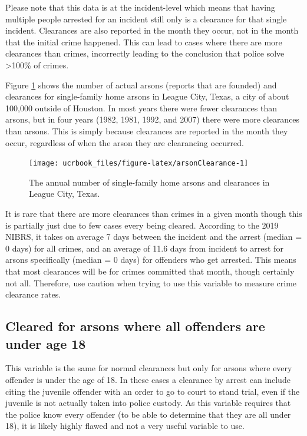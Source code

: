 \documentclass[
  12pt,
  openany]{book}
\begin{document}
Please note that this data is at the incident-level which means that having multiple people arrested for an incident still only is a clearance for that single incident. Clearances are also reported in the month they occur, not in the month that the initial crime happened. This can lead to cases where there are more clearances than crimes, incorrectly leading to the conclusion that police solve \textgreater100\% of crimes.

Figure \ref{fig:arsonClearance} shows the number of actual arsons (reports that are founded) and clearances for single-family home arsons in League City, Texas, a city of about 100,000 outside of Houston. In most years there were fewer clearances than arsons, but in four years (1982, 1981, 1992, and 2007) there were more clearances than arsons. This is simply because clearances are reported in the month they occur, regardless of when the arson they are clearancing occurred.

\begin{figure}

{\centering \texttt{[image: ucrbook\_files/figure-latex/arsonClearance-1]} 

}

\caption{The annual number of single-family home arsons and clearances in League City, Texas.}\label{fig:arsonClearance}
\end{figure}

It is rare that there are more clearances than crimes in a given month though this is partially just due to few cases every being cleared. According to the 2019 NIBRS, it takes on average 7 days between the incident and the arrest (median = 0 days) for all crimes, and an average of 11.6 days from incident to arrest for arsons specifically (median = 0 days) for offenders who get arrested. This means that most clearances will be for crimes committed that month, though certainly not all. Therefore, use caution when trying to use this variable to measure crime clearance rates.

\hypertarget{cleared-for-arsons-where-all-offenders-are-under-age-18}{%
\subsection{Cleared for arsons where all offenders are under age 18}\label{cleared-for-arsons-where-all-offenders-are-under-age-18}}

This variable is the same for normal clearances but only for arsons where every offender is under the age of 18. In these cases a clearance by arrest can include citing the juvenile offender with an order to go to court to stand trial, even if the juvenile is not actually taken into police custody. As this variable requires that the police know every offender (to be able to determine that they are all under 18), it is likely highly flawed and not a very useful variable to use.
\end{document}
